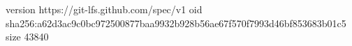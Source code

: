 version https://git-lfs.github.com/spec/v1
oid sha256:a62d3ac9c0bc972500877baa9932b928b56ae67f570f7993d46bf853683b01c5
size 43840
